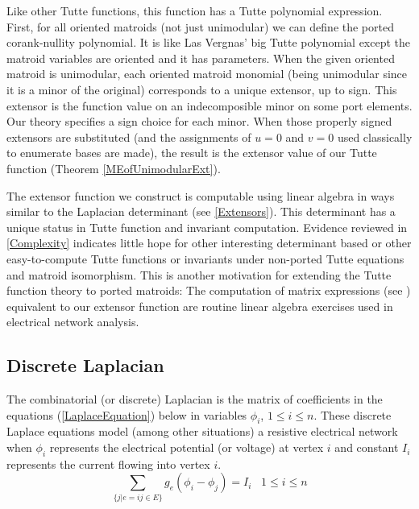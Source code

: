 \documentclass[12pt]{article}
\theoremstyle{definition}
\begin{document}
Like other Tutte functions, this function has a Tutte polynomial expression.
First, for all oriented matroids (not just unimodular) we can define
the ported corank-nullity polynomial.  It is like Las Vergnas'
big Tutte polynomial
except the matroid variables are oriented and it has parameters.  When the
given oriented matroid is unimodular, each oriented matroid
monomial (being unimodular since it is a minor of the original)
corresponds to a unique extensor, up to sign.  
This extensor is the function value on an indecomposible minor on
some port elements.
Our theory specifies
a sign choice for each minor.  When those 
properly signed extensors are substituted (and the
assignments of $u=0$ and $v=0$ used classically to enumerate bases are made),
the result is the extensor value of our Tutte 
function (Theorem \ref{MEofUnimodularExt}).

The extensor function we construct is computable
using linear algebra in ways similar to the 
Laplacian determinant (see \textsection \ref{Extensors}).  This determinant
has a unique status in
Tutte function and invariant computation. 
Evidence reviewed in \textsection \ref{Complexity}
indicates little hope for other interesting 
determinant based or other easy-to-compute Tutte functions or invariants 
under non-ported Tutte equations and matroid isomorphism.
This is another motivation
for extending the Tutte function theory to ported matroids:
The computation of matrix expressions 
(see \cite[]{LinNonLinCircuitsBook}) equivalent to 
our extensor function are routine 
linear algebra exercises used in electrical network analysis. 





\subsection{Discrete Laplacian}
\label{Laplacian}
The combinatorial (or discrete) Laplacian
is the matrix of coefficients
in the equations (\ref{LaplaceEquation}) 
below
in variables $\phi_i$, $1\leq i \leq n$.
These discrete Laplace equations model (among other 
situations) a resistive electrical network
when $\phi_i$ represents the electrical potential 
(or voltage) at vertex $i$ and
constant $I_i$ represents the current flowing into
vertex $i$.
\begin{equation}
\label{LaplaceEquation}
\sum_{\{j | e=ij\in E\}}
g_e(\phi_i-\phi_j) = I_i \;\;\; 1\le i \le n
\end{equation}
\end{document}
